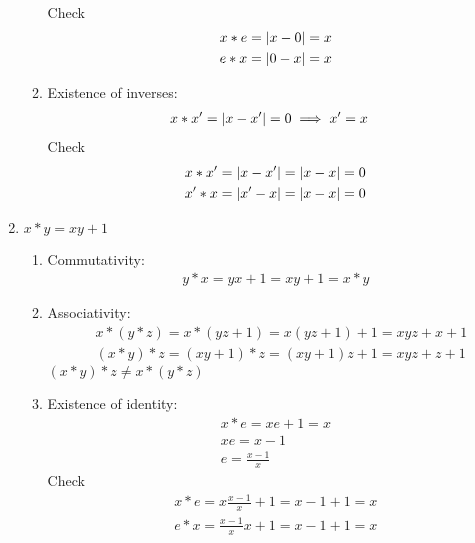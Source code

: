 \documentclass[nohyper,nobib]{tufte-handout}
\theoremstyle{definition}
\theoremstyle{remark}
\begin{document}
\begin{enumerate}
\begin{enumerate}[I]
\begin{align}
                \end{align}
                Check
                \begin{align}
                    &x * e = \abs{x - 0} = x \nonumber \\
                    &e * x = \abs{0 - x} = x
                \end{align}
            \item Existence of inverses:
                \begin{align}
                    &x * x' = \abs{x - x'} = 0  \implies x' = x
                \end{align}
                Check
                \begin{align}
                    &x * x' = \abs{x - x'} = \abs{x - x} = 0 \nonumber \\
                    &x' * x = \abs{x' - x} = \abs{x - x} = 0 
                \end{align}
        \end{enumerate}
    \item $x * y = xy + 1$
        \begin{enumerate}[i]
            \item Commutativity:
                \begin{align}
                    y * x = yx + 1 = xy + 1 = x * y
                \end{align}
            \item Associativity:
                \begin{align}
                    &x * (y * z) = x * (yz + 1) = x(yz + 1) + 1 = xyz + x + 1 \nonumber \\
                    &(x * y) * z = (xy + 1)*z = (xy + 1)z + 1 = xyz + z + 1 
                \end{align}
                $(x * y) * z \neq x * (y * z)$
            \item Existence of identity:
                \begin{align}
                    x * e =  xe + 1 = x \nonumber \\
                    xe = x - 1  \nonumber \\
                    e = \frac{x-1}{x}
                \end{align}
                Check
                \begin{align}
                    x * e = x\frac{x-1}{x} + 1 = x - 1 + 1 = x \nonumber \\
                    e * x = \frac{x-1}{x}x + 1 = x - 1 + 1 = x

\end{align}
\end{enumerate}
\end{enumerate}
\end{document}
